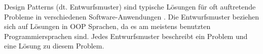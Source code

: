 Design Patterns (dt. Entwurfsmuster) sind typische Lösungen für oft auftretende Probleme in verschiedenen Software-Anwendungen \cite{OOPPaterns}. 
Die Entwurfsmuster beziehen sich auf Lösungen in OOP Sprachen, da es am meistens benutzten Programmiersprachen sind. 
Jedes Entwurfsmuster beschreibt ein Problem und eine Lösung zu diesem Problem.
